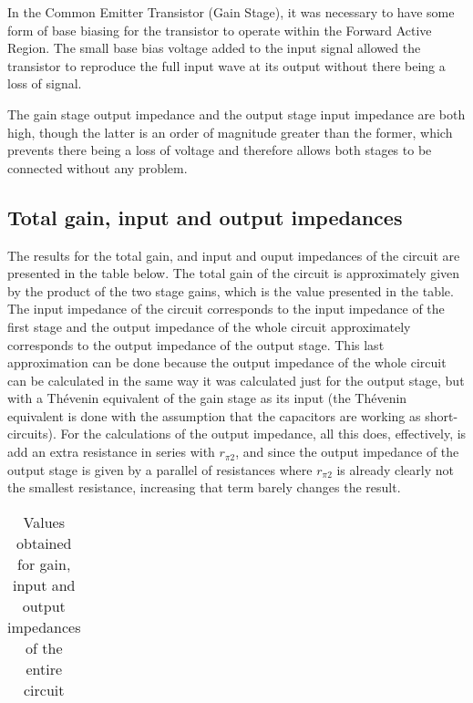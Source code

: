 In the Common Emitter Transistor (Gain Stage), it was necessary to have some form of base biasing for the transistor to operate within the Forward Active Region. The small base bias voltage added to the input signal allowed the transistor to reproduce the full input wave at its output without there being a loss of signal.

The gain stage output impedance and the output stage input impedance are both high, though the latter is an order of magnitude greater than the former, which prevents there being a loss of voltage and therefore allows both stages to be connected without any problem.



\subsection{Total gain, input and output impedances}

The results for the total gain, and input and ouput impedances of the circuit are presented in the table below. The total gain of the circuit is approximately given by the product of the two stage gains, which is the value presented in the table. The input impedance of the circuit corresponds to the input impedance of the first stage and the output impedance of the whole circuit approximately corresponds to the output impedance of the output stage.
This last approximation can be done because the output impedance of the whole circuit can be calculated in the same way it was calculated just for the output stage, but with a Thévenin equivalent of the gain stage as its input (the Thévenin equivalent is done with the assumption that the capacitors are working as short-circuits). For the calculations of the output impedance, all this does, effectively, is add an extra resistance in series with $r_{\pi2}$, and since the output impedance of the output stage is given by a parallel of resistances where $r_{\pi2}$ is already clearly not the smallest resistance, increasing that term barely changes the result.

\begin{table}[H]
  \centering
  \begin{tabular}{|c|c|}
    \hline
      
  \end{tabular}
  \caption{Values obtained for gain, input and output impedances of the entire circuit}
  \label{tab:resultsAC2}
\end{table}

